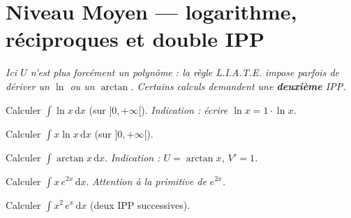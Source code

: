 \documentclass[11pt,a4paper]{article}
\newcommand{\dd}{\mathrm{d}}
\begin{document}
\section*{Niveau Moyen — logarithme, réciproques et double IPP}

\emph{Ici $U$ n'est plus forcément un polynôme : la règle L.I.A.T.E. impose parfois de dériver un $\ln$
ou un $\arctan$. Certains calculs demandent une \textbf{deuxième} IPP.}

\begin{exo}[1]
Calculer $\displaystyle \int \ln x\,\dd x$ (sur $]0,+\infty[$). \textit{Indication : écrire $\ln x=1\cdot\ln x$.}
\end{exo}

\begin{exo}[2]
Calculer $\displaystyle \int x\ln x\,\dd x$ (sur $]0,+\infty[$).
\end{exo}

\begin{exo}[3]
Calculer $\displaystyle \int \arctan x\,\dd x$. \textit{Indication : $U=\arctan x$, $V'=1$.}
\end{exo}

\begin{exo}[4]
Calculer $\displaystyle \int x\,e^{2x}\,\dd x$. \textit{Attention à la primitive de $e^{2x}$.}
\end{exo}

\begin{exo}[5]
Calculer $\displaystyle \int x^{2}\,e^{x}\,\dd x$ (deux IPP successives).
\end{exo}
\end{document}
